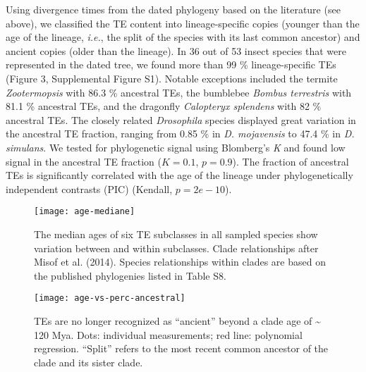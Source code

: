 Using divergence times from the dated phylogeny based on the literature
(see above), we classified the TE content into lineage-specific copies
(younger than the age of the lineage, \emph{i.e.}, the split of the
species with its last common ancestor) and ancient copies (older than
the lineage). In 36 out of 53 insect species that were represented in
the dated tree, we found more than 99 \% lineage-specific TEs (Figure 3,
Supplemental Figure S1). Notable exceptions included the termite
\emph{Zootermopsis} with 86.3 \% ancestral TEs, the bumblebee
\emph{Bombus terrestris} with 81.1 \% ancestral TEs, and the dragonfly
\emph{Calopteryx splendens} with 82 \% ancestral TEs. The closely
related \emph{Drosophila} species displayed great variation in the
ancestral TE fraction, ranging from 0.85 \% in \emph{D. mojavensis} to
47.4 \% in \emph{D. simulans}. We tested for phylogenetic signal using
Blomberg's \emph{K} and found low signal in the ancestral TE fraction
(\(K = 0.1\), \(p = 0.9\)). The fraction of ancestral TEs
is significantly correlated with the age of the lineage under
phylogenetically independent contrasts (PIC) (Kendall,
\(p = 2e-10\)).

\begin{figure}[h!]
\begin{center}
\texttt{[image: age-mediane]}
\caption[Median ages of transposable elements in arthropods]{{The median ages of six TE subclasses in all sampled species show
variation between and within subclasses. Clade relationships after Misof
et al. (2014). Species relationships within clades are based on the
published phylogenies listed in Table S8.
{\label{301428}}%
}}
\end{center}
\end{figure}

\begin{figure}[h!]
\begin{center}
\texttt{[image: age-vs-perc-ancestral]}
\caption[TEs are no longer recognized as ``ancient'' beyond a clade age of
\textasciitilde{} 120 Mya]{{TEs are no longer recognized as ``ancient'' beyond a clade age of
\textasciitilde{} 120 Mya. Dots: individual measurements; red line:
polynomial regression. ``Split'' refers to the most recent common
ancestor of the clade and its sister clade.
{\label{807049}}%
}}
\end{center}
\end{figure}

